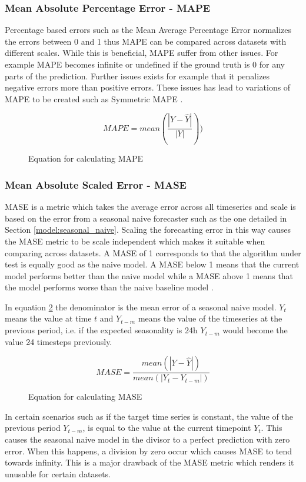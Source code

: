 \subsubsection{Mean Absolute Percentage Error - MAPE}
Percentage based errors such as the Mean Average Percentage Error normalizes the errors between 0 and 1 thus MAPE can be compared across datasets with different scales. While this is beneficial, MAPE suffer from other issues. For example MAPE becomes infinite or undefined if the ground truth is 0 for any parts of the prediction. Further issues exists for example that it penalizes negative errors more than positive errors. These issues has lead to variations of MAPE to be created such as Symmetric MAPE \cite{hyndman_forecasting_3rd,gluonts-github}.

\begin{figure}[h]
  \[MAPE = mean(\frac{|Y - \hat{Y}|}{|Y|}))\]
  \caption{Equation for calculating MAPE}
  \label{eq:MAPE}
\end{figure}

\subsubsection{Mean Absolute Scaled Error - MASE}
MASE is a metric which takes the average error across all timeseries and scale is based on the error from a seasonal naive forecaster such as the one detailed in Section \ref{model:seasonal_naive}. Scaling the forecasting error in this way causes the MASE metric to be scale independent which makes it suitable when comparing across datasets. A MASE of 1 corresponds to that the algorithm under test is equally good as the naive model. A MASE below 1 means that the current model performs better than the naive model while a MASE above 1 means that the model performs worse than the naive baseline model \cite{hyndman_forecasting_3rd,gluonts-github}.

In equation \ref{eq:MASE} the denominator is the mean error of a seasonal naive model. \(Y_t\) means the value at time \(t\) and \(Y_{t-m}\) means the value of the timeseries at the previous period, i.e. if the expected seasonality is 24h \(Y_{t-m}\) would become the value 24 timesteps previously.

\begin{figure}[h]
  \[MASE = \frac{mean(|Y - \hat{Y}|)}{mean(|Y_t - Y_{t-m}|)}\]
  \caption{Equation for calculating MASE}
  \label{eq:MASE}
\end{figure}

In certain scenarios such as if the target time series is constant, the value of the previous period \(Y_{t-m}\), is equal to the value at the current timepoint \(Y_t\). This causes the seasonal naive model in the divisor to a perfect prediction with zero error. When this happens, a division by zero occur which causes MASE to tend towards infinity. This is a major drawback of the MASE metric which renders it unusable for certain datasets.

